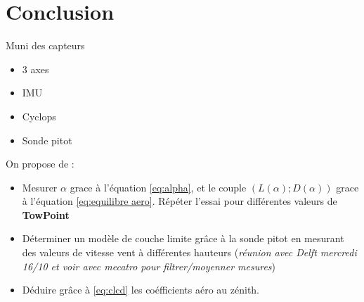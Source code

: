 \section{Conclusion} 
\label{sec:Ch2.4}

Muni des capteurs
\begin{itemize}
    \item 3 axes
    \item IMU
    \item Cyclops
    \item Sonde pitot\\
\end{itemize} 

On propose de :
\begin{itemize}
    \item Mesurer $\alpha$ grace à l'équation \ref{eq:alpha}, et le couple $(L(\alpha);D(\alpha))$ grace à l'équation \ref{eq:equilibre aero}. Répéter l'essai pour différentes valeurs de \textbf{TowPoint}
    \item Déterminer un modèle de couche limite grâce à la sonde pitot en mesurant des valeurs de vitesse vent à différentes hauteurs (\textit{réunion avec Delft mercredi 16/10 et voir avec mecatro pour filtrer/moyenner mesures})
    \item Déduire grâce à \ref{eq:clcd} les coéfficients aéro au zénith.
\end{itemize} 